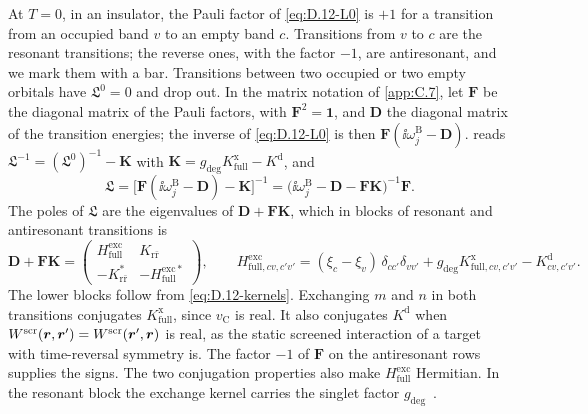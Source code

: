At $T = 0$, in an insulator, the Pauli factor of \cref{eq:D.12-L0} is $+1$ for a transition from an occupied band $v$ to an empty band $c$. Transitions from $v$ to $c$ are the resonant transitions; the reverse ones, with the factor $-1$, are antiresonant, and we mark them with a bar. Transitions between two occupied or two empty orbitals have $\mathfrak{L}^0 = 0$ and drop out. In the matrix notation of \cref{app:C.7}, let $\mathbf{F}$ be the diagonal matrix of the Pauli factors, with $\mathbf{F}^2 = \mathbf{1}$, and $\mathbf{D}$ the diagonal matrix of the transition energies; the inverse of \cref{eq:D.12-L0} is then $\mathbf{F}(\ii\omega^{\mathrm{B}}_j - \mathbf{D})$.  reads $\mathfrak{L}^{-1} = (\mathfrak{L}^0)^{-1} - \mathbf{K}$ with $\mathbf{K} = g_{\mathrm{deg}}K^{\mathrm{x}}_{\mathrm{full}} - K^{\mathrm{d}}$, and
\begin{equation}
  \mathfrak{L} = \bigl[\mathbf{F}(\ii\omega^{\mathrm{B}}_j - \mathbf{D}) - \mathbf{K}\bigr]^{-1} = \bigl(\ii\omega^{\mathrm{B}}_j - \mathbf{D} - \mathbf{F}\mathbf{K}\bigr)^{-1}\mathbf{F} .
  \label{eq:D.12-Lsol}
\end{equation}
The poles of $\mathfrak{L}$ are the eigenvalues of $\mathbf{D} + \mathbf{F}\mathbf{K}$, which in blocks of resonant and antiresonant transitions is
\begin{equation}
  \mathbf{D} + \mathbf{F}\mathbf{K} = \begin{pmatrix} H^{\mathrm{exc}}_{\mathrm{full}} & K_{\mathrm{r}\bar{\mathrm{r}}} \\ -K_{\mathrm{r}\bar{\mathrm{r}}}^* & -H^{\mathrm{exc}*}_{\mathrm{full}}\end{pmatrix}, \qquad
  H^{\mathrm{exc}}_{\mathrm{full},cv,c'v'} = (\xi_c - \xi_v)\,\delta_{cc'}\delta_{vv'} + g_{\mathrm{deg}}K^{\mathrm{x}}_{\mathrm{full},cv,c'v'} - K^{\mathrm{d}}_{cv,c'v'} .
  \label{eq:D.12-blocks}
\end{equation}
The lower blocks follow from \cref{eq:D.12-kernels}. Exchanging $m$ and $n$ in both transitions conjugates $K^{\mathrm{x}}_{\mathrm{full}}$, since $v_{\mathrm{C}}$ is real. It also conjugates $K^{\mathrm{d}}$ when $W^{\mathrm{scr}}(\bm{r},\bm{r}') = W^{\mathrm{scr}}(\bm{r}',\bm{r})$ is real, as the static screened interaction of a target with time-reversal symmetry is. The factor $-1$ of $\mathbf{F}$ on the antiresonant rows supplies the signs. The two conjugation properties also make $H^{\mathrm{exc}}_{\mathrm{full}}$ Hermitian. In the resonant block the exchange kernel carries the singlet factor $g_{\mathrm{deg}}$~\cite[Eqs.~(18) and (20)]{blase2020bethe}.

